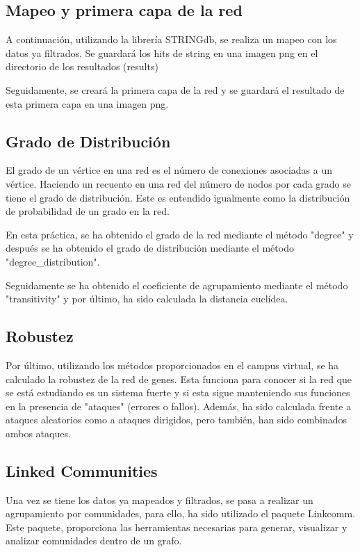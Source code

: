 \subsection{Mapeo y primera capa de la red}
A continuación, utilizando la librería STRINGdb, se realiza un mapeo con los datos ya filtrados. Se guardará los hits de string en una imagen png en el directorio de los resultados (results)

Seguidamente, se creará la primera capa de la red y se guardará el resultado de esta primera capa en una imagen png. 

\subsection{Grado de Distribución}
El grado de un vértice en una red es el número de conexiones asociadas a un vértice. Haciendo un recuento en una red del número de nodos por cada grado se tiene el grado de distribución. Este es entendido igualmente como la distribución de probabilidad de un grado en la red.

En esta práctica, se ha obtenido el grado de la red mediante el  método "degree" y después se ha obtenido el grado de distribución mediante el método "degree\_distribution".

Seguidamente se ha obtenido el coeficiente de agrupamiento mediante el método "transitivity" y por último, ha sido calculada la distancia euclídea. 

\subsection{Robustez}
Por último, utilizando los métodos proporcionados en el campus virtual, se ha calculado la robustez de la red de genes. Esta funciona para conocer si la red que se está estudiando es un sistema fuerte y si esta sigue manteniendo sus funciones en la presencia de "ataques" (errores o fallos). Además, ha sido calculada frente a ataques aleatorios como a ataques dirigidos, pero también, han sido combinados ambos ataques.


\subsection{Linked Communities}
Una vez se tiene los datos ya mapeados y filtrados, se pasa a realizar un agrupamiento por comunidades, para ello, ha sido utilizado el paquete Linkcomm. Este paquete, proporciona las herramientas necesarias para generar, visualizar y analizar comunidades dentro de un grafo.

